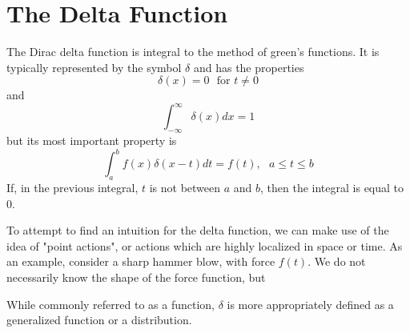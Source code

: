 \section{The Delta Function}
The Dirac delta function is integral to the method of green's functions. It is typically represented by the symbol \(\delta\) and has the properties
\begin{equation}
    \delta(x) = 0~~~ \text{for } t\neq0
\end{equation}
and
\begin{equation}
    \int_{-\infty}^{\infty} \delta(x) dx = 1
\end{equation}
but its most important property is 
\begin{equation}
    \int_a^b f(x)\delta(x-t) dt= f(t), ~~~ a\leq t \leq b
\end{equation}
If, in the previous integral, \(t\) is not between \(a\) and \(b\), then the integral is equal to 0. 

To attempt to find an intuition for the delta function, we can make use of the idea of "point actions", or actions which are highly localized in space or time. As an example, consider a sharp hammer blow, with force \(f(t)\). We do not necessarily know the shape of the force function, but 

While commonly referred to as a function, \(\delta\) is more appropriately defined as a generalized function or a distribution. 